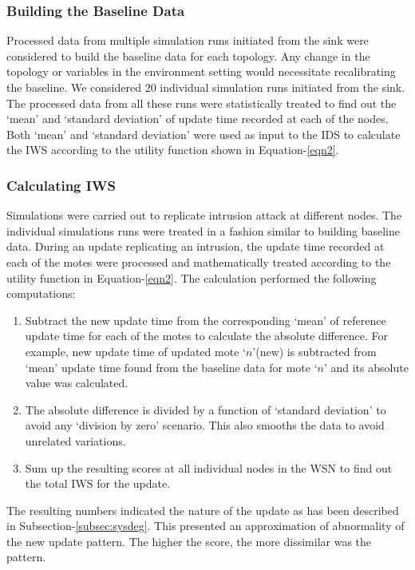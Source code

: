 \documentclass[conference,final]{IEEEtran}
\begin{document}
\subsubsection*{Building the Baseline Data}
\label{ssc:build_baseline}

Processed data from multiple simulation runs initiated from the sink were considered to build the baseline data for each topology.
Any change in the topology or variables in the environment setting would necessitate recalibrating the baseline.
We considered 20 individual simulation runs initiated from the sink.
The processed data from all these runs were statistically treated to find out the `mean' and `standard deviation' of update time recorded at each of the nodes.
Both `mean' and `standard deviation' were used as input to the IDS to calculate the IWS according to the utility function shown in Equation-\ref{eqn2}. 

\subsubsection*{Calculating IWS}
\label{ssc:calc_iws}

Simulations were carried out to replicate intrusion attack at different nodes.
The individual simulations runs were treated in a fashion  similar to building baseline data.
During an update replicating an intrusion, the update time recorded at each of the motes were processed  and mathematically treated according to the utility function in Equation-\ref{eqn2}. The calculation performed the following computations:
\begin{enumerate}
\item Subtract the new update time from the corresponding `mean' of reference update time for each of the motes to calculate the absolute difference. For example, new update time of updated mote `$n$'(new) is subtracted from `mean' update time found from the baseline data for mote `$n$' and its absolute value was calculated.
\item The absolute difference is divided by a function of `standard deviation' to avoid any `division by zero' scenario. This also smooths the data to avoid unrelated variations.
\item Sum up the resulting scores at all individual nodes in the WSN to find out the total IWS for the update.
\end{enumerate}
The resulting numbers indicated the nature of the update as has been described in Subsection-\ref{subsec:sysdeg}.
This presented an approximation of abnormality of the new update pattern. The higher the score, the more dissimilar was the pattern. 
\end{document}
